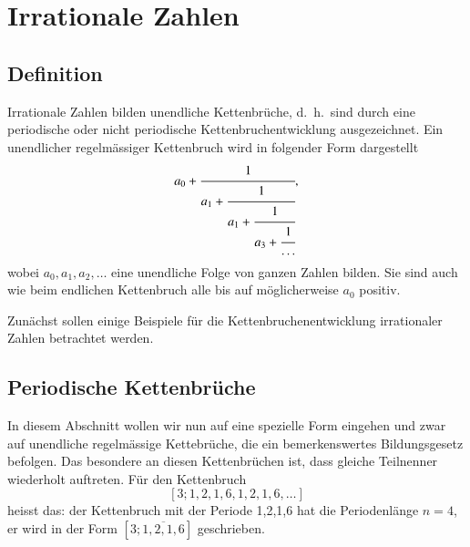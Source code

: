 %
%
%
\section{Irrationale Zahlen
\label{kettenbruch:section:Irrationale Zahlen}}
%
\subsection{Definition}
Irrationale Zahlen bilden unendliche Kettenbrüche, d.~h.~sind durch
eine periodische oder nicht periodische Kettenbruchentwicklung
ausgezeichnet.
Ein unendlicher regelmässiger Kettenbruch wird in folgender Form dargestellt
\begin{equation}
a_0 + \cfrac{1}{a_1+\cfrac{1}{a_1+\cfrac{1}{a_3+\cfrac{1}{\dots}}}},
\end{equation}
wobei $a_0,a_1,a_2,\dots$ eine unendliche Folge von ganzen Zahlen bilden. 
Sie sind auch wie beim endlichen Kettenbruch
alle bis auf möglicherweise $a_0$ positiv.


Zunächst sollen einige Beispiele für die Kettenbruchenentwicklung
irrationaler Zahlen betrachtet werden.

\subsection{Periodische Kettenbrüche}
In diesem Abschnitt wollen wir nun auf eine spezielle Form eingehen
und zwar auf unendliche regelmässige Kettebrüche, die ein bemerkenswertes
Bildungsgesetz befolgen. Das besondere an diesen Kettenbrüchen ist,
dass gleiche Teilnenner wiederholt auftreten.
Für den Kettenbruch
\[
[3;1,2,1,6,1,2,1,6,\dots]
\]
heisst das: der
Kettenbruch mit der Periode 1,2,1,6 hat die Periodenlänge $n=4$, er
wird in der Form $[3;\overline{1,2,1,6}]$ geschrieben.

